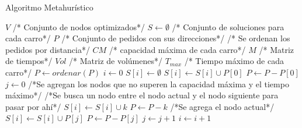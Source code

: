\documentclass[12pt]{article}
\begin{document}
\begin{algorithm}
\caption{Algoritmo Metahurístico}
\begin{algorithmic}[1]
\STATE $V$ /* Conjunto de nodos optimizados*/
\STATE $S \leftarrow \emptyset$ /* Conjunto de soluciones para cada carro*/
\STATE $P$ /* Conjunto de pedidos con sus direcciones*/
/* Se ordenan los pedidos por distancia*/
\STATE $CM$ /* capacidad máxima de cada carro*/
\STATE $M$ /* Matriz de tiempos*/
\STATE $Vol$ /* Matriz de volúmenes*/
\STATE $T_{max}$ /* Tiempo máximo de cada carro*/
\STATE $P \leftarrow ordenar(P)$
\STATE $i \leftarrow 0$
\STATE $S[i] \leftarrow \emptyset$
\STATE $S[i] \leftarrow S[i] \cup P[0]$
\STATE $P \leftarrow P - P[0]$
\STATE $j \leftarrow 0$
\STATE /*Se agregan los nodos que no superen la capacidad máxima y el tiempo máximo*/
\STATE /*Se busca un nodo entre el nodo actual y el nodo siguiente para pasar por ahí*/
\STATE $S[i] \leftarrow S[i] \cup k$
\STATE $P \leftarrow P - k$
\ENDIF
\STATE /*Se agrega el nodo actual*/
\STATE $S[i] \leftarrow S[i] \cup P[j]$
\STATE $P \leftarrow P - P[j]$
\STATE $j \leftarrow j + 1$
\ENDWHILE
\STATE $i \leftarrow i + 1$
\ENDWHILE
\end{algorithmic}
\end{algorithm}
\end{document}
